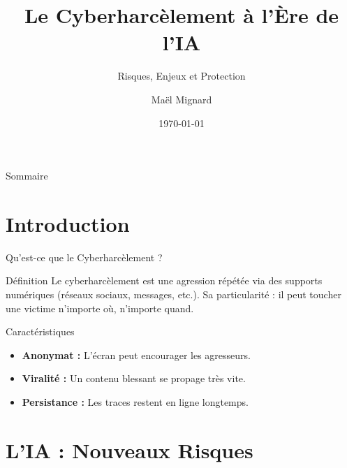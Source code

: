 \documentclass[10pt, aspectratio=169]{beamer}
\title{Le Cyberharcèlement à l'Ère de l'IA}
\subtitle{Risques, Enjeux et Protection}
\author{Maël Mignard}
\institute{BTS SIO}
\date{\today}
\begin{document}
\frame{\titlepage}

\begin{frame}{Sommaire}
  \tableofcontents
\end{frame}

\section{Introduction}

\begin{frame}{Qu'est-ce que le Cyberharcèlement ?}
  \begin{block}{Définition}
    Le cyberharcèlement est une agression répétée via des supports numériques (réseaux sociaux, messages, etc.).
    \pause
    Sa particularité : il peut toucher une victime n'importe où, n'importe quand.
  \end{block}
  
  \begin{alertblock}{Caractéristiques}
    \begin{itemize}
      \item \textbf{Anonymat :} L'écran peut encourager les agresseurs.
      \item \textbf{Viralité :} Un contenu blessant se propage très vite.
      \item \textbf{Persistance :} Les traces restent en ligne longtemps.
    \end{itemize}
  \end{alertblock}
\end{frame}

\section{L'IA : Nouveaux Risques}
\end{document}

